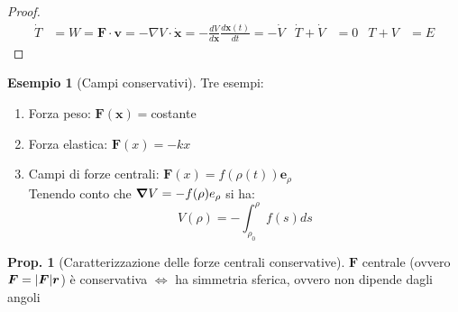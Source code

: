 \documentclass[a4paper,10pt]{article}
\theoremstyle{definition}
\newcommand{\bv}{\boldsymbol} %
\theoremstyle{indentdefinition}
\theoremstyle{indenttheorem}
\newtheorem{prop}{Prop.}
\theoremstyle{myremark}
\newtheorem{example*}{Esempio}
\theoremstyle{indentgeneral}
\begin{document}
\begin{proof}
\begin{align*}
\dot{T} & =W=\boldsymbol{F}\cdot\boldsymbol{v}=-\nabla V\cdot\dot{\bv{x}}=-\frac{dV}{d\bv{x}}\frac{d\bv{x}(t)}{dt}=-\dot{V} & \dot{T}+\dot{V} & =0 & T+V & =E
\end{align*}
\end{proof}

\begin{example*}[Campi conservativi] Tre esempi:
    \begin{enumerate}
        \item Forza peso: $\bv{F}(\bv{x})=$costante
        \item Forza elastica: $\bv{F}(x)=-kx$
        \item Campi di forze centrali: $\bv{F}(x)=f(\rho(t))\bv{e}_\rho$ \\
        Tenendo conto che $\grad V=-f(\rho){e}_\rho$ si ha: $$V(\rho)=-\int_{\rho_0}^{\rho}f(s)ds$$
    \end{enumerate}
\end{example*}

\begin{prop}[Caratterizzazione delle forze centrali conservative] $\bv{F}$ centrale (ovvero $\bv{F}=\abs{\bv{F}}\bv{r}$) è conservativa $\iff$ ha simmetria sferica, ovvero non dipende dagli angoli
    
\end{prop}
\end{document}
